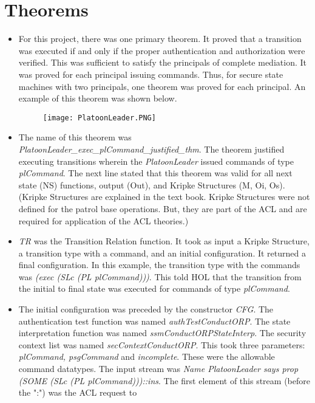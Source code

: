 \chapter{Theorems}
\label{cha:theorems}

\begin{itemize}
\item For this project, there was one primary theorem.  It proved that a transition was executed if
  and only if the proper authentication and authorization were verified.  This was sufficient to
  satisfy the principals of complete mediation.  It was proved for each principal issuing commands.
  Thus, for secure state machines with two principals, one theorem was proved for each principal.
  An example of this theorem was shown below.
\begin{figure}[h]
  \centering
  \texttt{[image: PlatoonLeader.PNG]}
\end{figure}
\item The name of this theorem was \textit{PlatoonLeader_exec_plCommand_justified_thm}.  The theorem
  justified executing transitions wherein the \textit{PlatoonLeader} issued commands of type \textit{plCommand}.
  The next line stated that this theorem was valid for all next state (NS) functions, output (Out),
  and Kripke Structures (M, Oi, Os).  (Kripke Structures are explained in the text book.  Kripke
  Structures were not defined for the patrol base operations.  But, they are part of the ACL and are
  required for application of the ACL theories.)
\item \textit{TR} was the Transition Relation function.  It took as input a Kripke Structure,
  a transition type with a command, and an initial configuration.  It returned a final configuration.
  In this example, the transition type with the commands was \textit{(exec (SLc (PL plCommand)))}.
  This told HOL that the transition from the initial to final state was executed for commands of type
  \textit{plCommand}.
\item The initial configuration was preceded by the constructor \textit{CFG}.  The authentication
  test function was named \textit{authTestConductORP}.  The state interpretation function was named
  \textit{ssmConductORPStateInterp}.  The security context list was named \textit{secContextConductORP}.
  This took three parameters: \textit{plCommand, psgCommand} and \textit{incomplete}.  These were the
  allowable command datatypes.  The input stream was \textit{Name PlatoonLeader says prop (SOME (SLc
    (PL plCommand)))::ins}. The first element of this stream (before the ":") was the ACL request to

\end{itemize}
